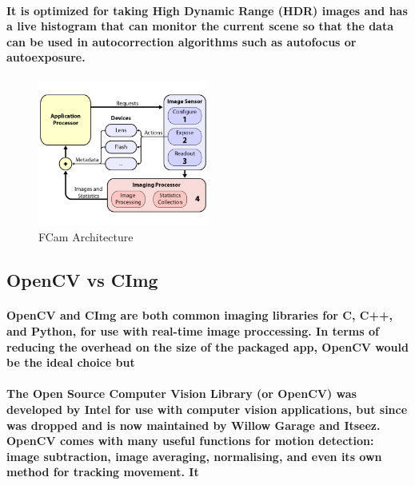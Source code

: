 \documentclass[11pt]{article} %
\begin{document}
\paragraph{It is optimized for taking High Dynamic Range (HDR) images and has a live histogram that can monitor the current scene so that the data can be used in autocorrection algorithms such as autofocus or autoexposure.
}
\begin{figure}
	\vspace{-40pt}
	\begin{center}
		\includegraphics[width=0.5\textwidth]{images/fcam_arch}
	\end{center}
	\vspace{-20pt}
	\caption{FCam Architecture}
\end{figure}


\subsection{OpenCV vs CImg}
\paragraph{OpenCV and CImg are both common imaging libraries for C, C++, and Python, for use with real-time image proccessing. In terms of reducing the overhead on the size of the packaged app, OpenCV would be the ideal choice but}
\paragraph{The Open Source Computer Vision Library (or OpenCV) was developed by Intel for use with computer vision applications, but since was dropped and is now maintained by Willow Garage and Itseez.
\\OpenCV comes with many useful functions for motion detection: image subtraction, image averaging, normalising, and even its own method for tracking movement. It
}
\end{document}
